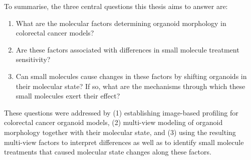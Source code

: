 \begin{flushleft}
To summarise, the three central questions this thesis aims to answer are:
\begin{enumerate}
    \item What are the molecular factors determining organoid morphology in colorectal cancer models?
    \item Are these factors associated with differences in small molecule treatment sensitivity? 
    \item Can small molecules cause changes in these factors by shifting organoids in their molecular state? If so, what are the mechanisms through which these small molecules exert their effect?
\end{enumerate}

These questions were addressed by (1) establishing image-based profiling for colorectal cancer organoid models, (2) multi-view modeling of organoid morphology together with their molecular state, and (3) using the resulting multi-view factors to interpret differences as well as to identify small molecule treatments that caused molecular state changes along these factors.

\end{flushleft}